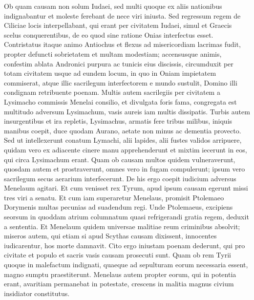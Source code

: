 \begin{biblechapter}
\begin{biblechapter}
\begin{biblechapter}
\begin{biblechapter}
\verse Ob quam causam non solum Iudaei, sed multi quoque ex aliis nationibus indignabantur et moleste ferebant de nece viri iniusta. 
\verse Sed regressum regem de Ciliciae locis interpellabant, qui erant per civitatem Iudaei, simul et Graecis scelus conquerentibus, de eo quod sine ratione Onias interfectus esset. 
\verse Contristatus itaque animo Antiochus et flexus ad misericordiam lacrimas fudit, propter defuncti sobrietatem et multam modestiam; 
\verse accensusque animis, confestim ablata Andronici purpura ac tunicis eius discissis, circumduxit per totam civitatem usque ad eundem locum, in quo in Oniam impietatem commiserat, atque illic sacrilegum interfectorem e mundo sustulit, Domino illi condignam retribuente poenam.
 \verse Multis autem sacrilegiis per civitatem a Lysimacho commissis Menelai consilio, et divulgata foris fama, congregata est multitudo adversum Lysimachum, vasis aureis iam multis dissipatis. 
\verse Turbis autem insurgentibus et ira repletis, Lysimachus, armatis fere tribus milibus, iniquis manibus coepit, duce quodam Aurano, aetate non minus ac dementia provecto. 
\verse Sed ut intellexerunt conatum Lymachi, alii lapides, alii fustes validos arripuere, quidam vero ex adiacente cinere manu apprehenderunt et mixtim iecerunt in eos, qui circa Lysimachum erant. 
\verse Quam ob causam multos quidem vulneraverunt, quosdam autem et prostraverunt, omnes vero in fugam compulerunt; ipsum vero sacrilegum secus aerarium interfecerunt.
 \verse De his ergo coepit iudicium adversus Menelaum agitari. 
\verse Et cum venisset rex Tyrum, apud ipsum causam egerunt missi tres viri a senatu. 
\verse Et cum iam superaretur Menelaus, promisit Ptolemaeo Dorymenis multas pecunias ad suadendum regi. 
\verse Unde Ptolemaeus, excipiens seorsum in quoddam atrium columnatum quasi refrigerandi gratia regem, deduxit a sententia. 
\verse Et Menelaum quidem universae malitiae reum criminibus absolvit; miseros autem, qui etiam si apud Scythas causam dixissent, innocentes iudicarentur, hos morte damnavit. 
\verse Cito ergo iniustam poenam dederunt, qui pro civitate et populo et sacris vasis causam prosecuti sunt. 
\verse Quam ob rem Tyrii quoque in malefactum indignati, quaeque ad sepulturam eorum necessaria essent, magno sumptu praestiterunt. 
 \verse Menelaus autem propter eorum, qui in potentia erant, avaritiam permanebat in potestate, crescens in malitia magnus civium insidiator constitutus.
 

\end{biblechapter}
\end{biblechapter}
\end{biblechapter}
\end{biblechapter}
